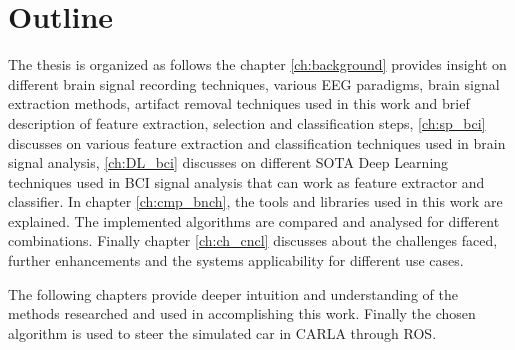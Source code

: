 \section{Outline} 
The thesis is organized as follows the chapter \ref{ch:background} provides insight on different brain signal recording techniques, various EEG paradigms, brain signal extraction methods, artifact removal techniques used in this work and brief description of feature extraction, selection and classification steps, \ref{ch:sp_bci} discusses on various feature extraction and classification techniques used in brain signal analysis, \ref{ch:DL_bci} discusses on different SOTA Deep Learning techniques used in BCI signal analysis that can work as feature extractor and classifier. In chapter \ref{ch:cmp_bnch}, the tools and libraries used in this work are explained. The implemented algorithms are compared and analysed for different combinations. Finally chapter \ref{ch:ch_cncl} discusses about the challenges faced, further enhancements and the systems applicability for different use cases.

The following chapters provide deeper intuition and understanding of the methods researched and used in accomplishing this work. Finally the chosen algorithm is used to steer the simulated car in CARLA through ROS.